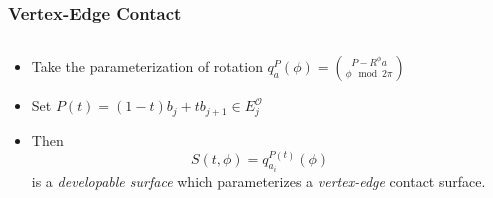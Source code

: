 \documentclass[ucs,9pt,pagenumbersfull]{beamer}
\begin{document}
\begin{frame}
  \frametitle{Vertex-Edge Contact}
  \begin{columns}[c]
    \begin{column}{0.5\textwidth}
      \begin{minipage}[c][\textheight]{\columnwidth}
        \begin{itemize}
        \item<1-> Take the parameterization of rotation \(q^P_a(\phi) = \binom{P-R^{\phi} a}{\phi \mod 2\pi}\)
        \item<2-> Set \(P(t) = (1-t) b_j + t b_{j+1} \in E^{\mathcal{O}}_j\)
        \item<3-> Then%
          \[S(t,\phi)  = q ^{P(t)}_{a_i}(\phi)\]%
          is a \emph{developable surface} which parameterizes a \emph{vertex-edge} contact surface.
        \end{itemize}
      \end{minipage}
  \end{column}
  \begin{column}{0.45\textwidth}
    \begin{minipage}[c][\textheight]{\columnwidth}
      \centering
    \end{minipage}
  \end{column}
\end{columns}
\end{frame}
\end{document}
